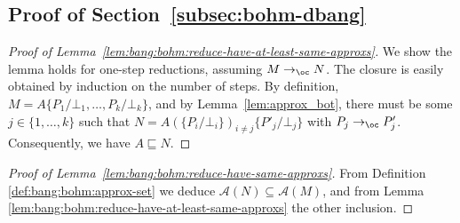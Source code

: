 \documentclass[10pt,a4paper]{article}
\newcommand{\<}{\langle}
\renewcommand{\>}{\rangle}
\newcommand{\todbf}{\to_{\oc}} %
\newcommand{\mcal}[1]{\ensuremath{\mathcal{#1}}}
\newcommand{\setApprox}{\mcal{A}}
\newcommand{\smaller}{\ensuremath{\sqsubseteq}}
\begin{document}
\subsection{Proof of Section~\ref{subsec:bohm-dbang}}

\begin{proof}[Proof of Lemma~\ref{lem:bang:bohm:reduce-have-at-least-same-approxs}]
	We show the lemma holds for one-step reductions, assuming $M\todbf N$. The closure is easily
	obtained  by induction on the number of steps. By definition,
	$M=A\{P_1/\bot_1,\dots ,P_k/\bot_k\}$, and by Lemma~\ref{lem:approx_bot}, there
	must be some $j\in\{1,\dots ,k\}$ such that $N=A(\{P_i/\bot_i\})_{i\neq
	j}\{P'_j/\bot_j\}$ with $P_j\todbf P_j'$. Consequently, we have
	$A\smaller N$.
\end{proof}

\begin{proof}[Proof of Lemma~\ref{lem:bang:bohm:reduce-have-same-approxs}]
	From Definition \ref{def:bang:bohm:approx-set} we deduce
	$\setApprox(N) \subseteq \setApprox(M)$, and from Lemma \ref{lem:bang:bohm:reduce-have-at-least-same-approxs} the other inclusion. 
\end{proof}
\end{document}
